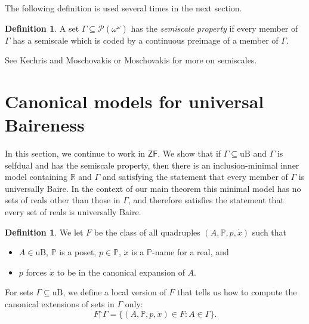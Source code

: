 \documentclass[fleqn, 11pt]{amsart}
\theoremstyle{plain}
\theoremstyle{definition}
\newtheorem{defn}[thm]{Definition} \newtheorem*{defn*}{Definition}
\theoremstyle{remark}
\newcommand{\uB}{\mathrm{uB}}
\newcommand{\restrict}{\mathord{\restriction}}
\newcommand{\powerset}{\mathcal{P}}
\begin{document}
The following definition is used several times in the next section. 


\begin{defn}
 A set $\Gamma \subseteq \powerset(\omega^\omega)$
has the \emph{semiscale property} if every member of $\Gamma$ has a semiscale which is coded by a continuous preimage of a member of $\Gamma$. 

\end{defn}


See Kechris and Moschovakis \cite{KecMosScales} or Moschovakis \cite{MosDST2009} for more on semiscales.

\section{Canonical models for universal Baireness}\label{canmodelsec}

In this section, we continue to work in $\mathsf{ZF}$.
We show that if $\Gamma \subseteq \uB$ and $\Gamma$ is selfdual and has the semiscale property, then there is an inclusion-minimal inner model containing $\mathbb{R}$ and $\Gamma$ and satisfying the statement that every member of $\Gamma$ is universally Baire. 
In the context of our main theorem this minimal model has no sets of reals other than those in $\Gamma$, and therefore satisfies the statement that every set of reals is universally Baire.



\begin{defn}%
We let $F$ be the class of all quadruples $(A,\mathbb{P},p,\dot{x})$ such that
\begin{itemize}
 \item $A \in \uB$,
  $\mathbb{P}$ is a poset,
  $p \in \mathbb{P}$,
  $\dot{x}$ is a $\mathbb{P}$-name for a real, and
 \item $p$ forces $\dot{x}$ to be in the canonical expansion of $A$.
\end{itemize}
\end{defn}

For sets $\Gamma \subseteq \uB$, we define a local version of $F$ that tells us how to compute the canonical extensions of sets in $\Gamma$ only:
\[F \restrict \Gamma = \{ (A,\mathbb{P},p,\dot{x}) \in F : A \in \Gamma\}.\]

\end{document}
